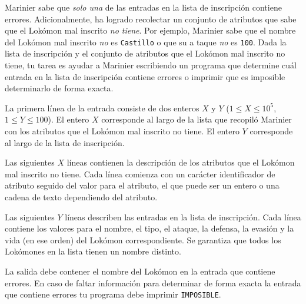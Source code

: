 \documentclass{oci}
\begin{document}
\begin{problemDescription}
Marinier sabe que \emph{solo una} de las entradas en la lista de inscripción
contiene errores.
Adicionalmente, ha logrado recolectar un conjunto de atributos que sabe que el Lokómon
mal inscrito \emph{no tiene}.
Por ejemplo, Marinier sabe que el nombre del Lokómon mal inscrito \emph{no} es \texttt{Castillo}
o que su a taque \emph{no} es \texttt{100}.
Dada la lista de inscripción y el conjunto de atributos que el Lokómon
mal inscrito no tiene, tu tarea es ayudar a Marinier escribiendo un programa que determine
cuál entrada en la lista de inscripción contiene errores o imprimir que es imposible
determinarlo de forma exacta.
\end{problemDescription}

\begin{inputDescription}
La primera línea de la entrada consiste de dos enteros $X$ y $Y$
($1 \leq X \leq 10^5$, $1 \leq Y \leq 100$).
El entero $X$ corresponde al largo de la lista que recopiló Marinier con los atributos
que el Lokómon mal inscrito no tiene.
El entero $Y$ corresponde al largo de la lista de inscripción.

Las siguientes $X$ líneas contienen la descripción de los atributos que el Lokómon mal
inscrito no tiene.
Cada línea comienza con un carácter identificador de atributo seguido del valor para el atributo,
el que puede ser un entero o una cadena de texto dependiendo del atributo.

Las siguientes $Y$ líneas describen las entradas en la lista de inscripción.
Cada línea contiene los valores para el nombre, el tipo, el ataque, la defensa,
la evasión y la vida (en ese orden) del Lokómon correspondiente.
Se garantiza que todos los Lokómones en la lista tienen un nombre distinto.
\end{inputDescription}

\begin{outputDescription}
La salida debe contener el nombre del Lokómon en la entrada que contiene errores.
En caso de faltar información para determinar de forma exacta la entrada que contiene errores
tu programa debe imprimir \texttt{IMPOSIBLE}.
\end{outputDescription}

\begin{sampleDescription}
\end{sampleDescription}
\end{document}

